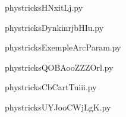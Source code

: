     \newcommand{\CaptionFigHNxitLj}{<+Type your caption here+>}
    \begin{center}
        
    \end{center}
    phystricksHNxitLj.py

    

    \clearpage
    


    \newcommand{\CaptionFigDynkinrjbHIu}{<+Type your caption here+>}
    \begin{center}
        
    \end{center}
    phystricksDynkinrjbHIu.py

    

    \clearpage
    


    \newcommand{\CaptionFigExempleArcParam}{<+Type your caption here+>}
    \begin{center}
        
    \end{center}
    phystricksExempleArcParam.py

    

    \clearpage
    


    \newcommand{\CaptionFigQOBAooZZZOrl}{<+Type your caption here+>}
    \begin{center}
        
    \end{center}
    phystricksQOBAooZZZOrl.py

    

    \clearpage
    


    \newcommand{\CaptionFigCbCartTuiii}{<+Type your caption here+>}
    \begin{center}
        
    \end{center}
    phystricksCbCartTuiii.py

    

    \clearpage
    


    \newcommand{\CaptionFigUYJooCWjLgK}{<+Type your caption here+>}
    \begin{center}
        
    \end{center}
    phystricksUYJooCWjLgK.py

